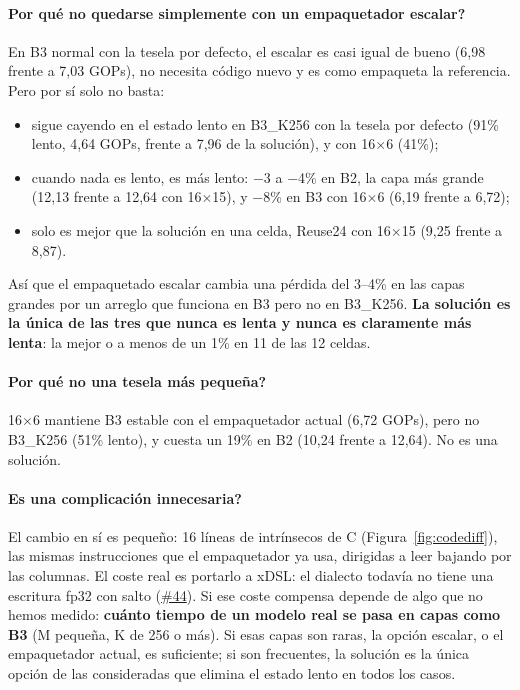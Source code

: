 \documentclass[10pt,a4paper]{article}
\newcommand{\iss}[1]{\href{https://github.com/JieGH/RVV_code_gen_via_MLIR_xDSL/issues/#1}{\##1}}
\newcommand{\key}[1]{\textbf{\textcolor{blue!55!black}{#1}}}  %
\begin{document}
\paragraph{\textquestiondown{}Por qué no quedarse simplemente con un empaquetador escalar?} En B3 normal con la tesela por defecto, el escalar es casi
igual de bueno (6,98 frente a 7,03 GOPs), no necesita código nuevo y es como empaqueta la referencia. Pero por sí solo no basta:
\begin{itemize}
  \item sigue cayendo en el estado lento en B3\_K256 con la tesela por defecto (91\% lento, 4,64 GOPs, frente a 7,96 de la solución), y
  con 16$\times$6 (41\%);
  \item cuando nada es lento, es más lento: $-$3 a $-$4\% en B2, la capa más grande (12,13 frente a 12,64 con 16$\times$15), y $-$8\%
  en B3 con 16$\times$6 (6,19 frente a 6,72);
  \item solo es mejor que la solución en una celda, Reuse24 con 16$\times$15 (9,25 frente a 8,87).
\end{itemize}
Así que el empaquetado escalar cambia una pérdida del 3--4\% en las capas grandes por un arreglo que funciona en B3 pero no en
B3\_K256. \key{La solución es la única de las tres que nunca es lenta y nunca es claramente más lenta}: la mejor o a menos de un 1\% en 11
de las 12 celdas.

\paragraph{\textquestiondown{}Por qué no una tesela más pequeña?} 16$\times$6 mantiene B3 estable con el empaquetador actual (6,72 GOPs), pero no
B3\_K256 (51\% lento), y cuesta un 19\% en B2 (10,24 frente a 12,64). No es una solución.

\paragraph{\textquestiondown{}Es una complicación innecesaria?} El cambio en sí es pequeño: 16 líneas de intrínsecos de C
(Figura~\ref{fig:codediff}), las mismas instrucciones que el empaquetador ya usa, dirigidas a leer bajando por las columnas. El coste
real es portarlo a xDSL: el dialecto todavía no tiene una escritura fp32 con salto (\iss{44}). Si ese coste compensa depende de algo
que no hemos medido: \textbf{cuánto tiempo de un modelo real se pasa en capas como B3} (M pequeña, K de 256 o más). Si esas capas son
raras, la opción escalar, o el empaquetador actual, es suficiente; si son frecuentes, la solución es la única opción de las
consideradas que elimina el estado lento en todos los casos.
\end{document}
